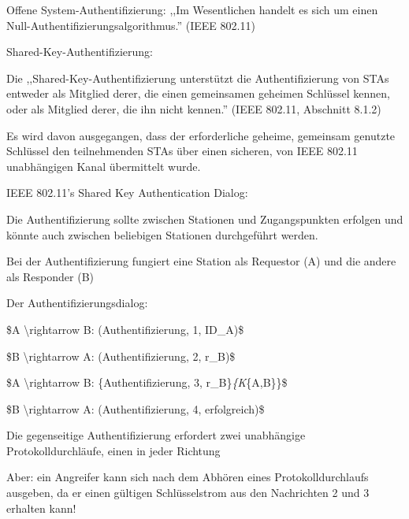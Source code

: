 \documentclass[a4paper]{article}
\begin{document}
\begin{multicols}{3}
\begin{itemize*}
            \begin{itemize*}
                  \item Offene System-Authentifizierung: ,,Im Wesentlichen handelt es sich um einen Null-Authentifizierungsalgorithmus.'' (IEEE 802.11)
                  \item Shared-Key-Authentifizierung:
                  \begin{itemize*} \item Die ,,Shared-Key-Authentifizierung unterstützt die Authentifizierung von STAs entweder als Mitglied derer, die einen gemeinsamen geheimen Schlüssel kennen, oder als Mitglied derer, die ihn nicht kennen.'' (IEEE 802.11, Abschnitt 8.1.2) \item Es wird davon ausgegangen, dass der erforderliche geheime, gemeinsam genutzte Schlüssel den teilnehmenden STAs über einen sicheren, von IEEE 802.11 unabhängigen Kanal übermittelt wurde. \end{itemize*}
            \end{itemize*}
      \end{itemize*}

      IEEE 802.11's Shared Key Authentication Dialog:

      \begin{itemize*}
            \item
            Die Authentifizierung sollte zwischen Stationen und Zugangspunkten
            erfolgen und könnte auch zwischen beliebigen Stationen durchgeführt
            werden.
            \item
            Bei der Authentifizierung fungiert eine Station als Requestor (A) und
            die andere als Responder (B)
            \item
            Der Authentifizierungsdialog:

            \begin{enumerate*}
                  \def\labelenumi{\arabic{enumi}.}
                  \item \$A \textbackslash rightarrow B: (Authentifizierung, 1, ID\_A)\$
                  \item \$B \textbackslash rightarrow A: (Authentifizierung, 2, r\_B)\$
                  \item \$A \textbackslash rightarrow B: \{Authentifizierung, 3, r\_B\}\emph{\{K}\{A,B\}\}\$
                  \item \$B \textbackslash rightarrow A: (Authentifizierung, 4, erfolgreich)\$
            \end{enumerate*}
            \item
            Die gegenseitige Authentifizierung erfordert zwei unabhängige
            Protokolldurchläufe, einen in jeder Richtung
            \item
            Aber: ein Angreifer kann sich nach dem Abhören eines
            Protokolldurchlaufs ausgeben, da er einen gültigen Schlüsselstrom aus
            den Nachrichten 2 und 3 erhalten kann!
      \end{itemize*}



\end{multicols}
\end{document}
